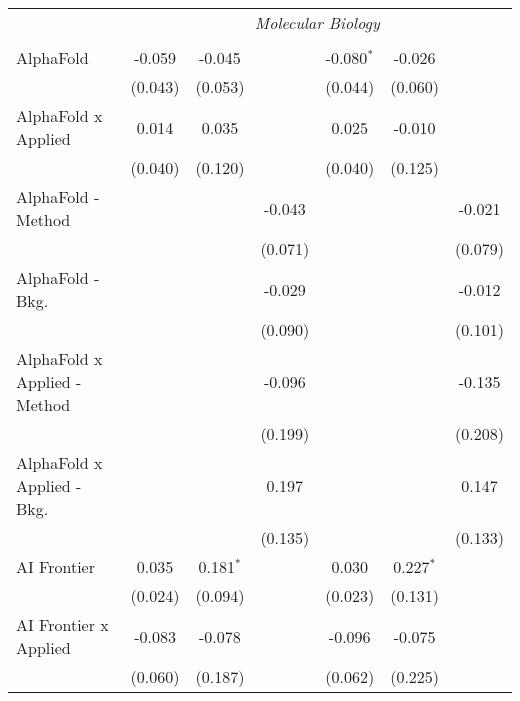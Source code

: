 \begin{tabular}{lcccccc}
 & \multicolumn{6}{c}{\textit{Molecular Biology}} \\ \\
   AlphaFold                      & -0.059  & -0.045        &                & -0.080$^{*}$ & -0.026         &   \\   
                                  & (0.043) & (0.053)       &                & (0.044)      & (0.060)        &   \\   
   AlphaFold x Applied            & 0.014   & 0.035         &                & 0.025        & -0.010         &   \\   
                                  & (0.040) & (0.120)       &                & (0.040)      & (0.125)        &   \\   
   AlphaFold - Method             &         &               & -0.043         &              &                & -0.021\\   
                                  &         &               & (0.071)        &              &                & (0.079)\\   
   AlphaFold - Bkg.               &         &               & -0.029         &              &                & -0.012\\   
                                  &         &               & (0.090)        &              &                & (0.101)\\   
   AlphaFold x Applied - Method   &         &               & -0.096         &              &                & -0.135\\   
                                  &         &               & (0.199)        &              &                & (0.208)\\   
   AlphaFold x Applied - Bkg.     &         &               & 0.197          &              &                & 0.147\\   
                                  &         &               & (0.135)        &              &                & (0.133)\\   
   AI Frontier                    & 0.035   & 0.181$^{*}$   &                & 0.030        & 0.227$^{*}$    &   \\   
                                  & (0.024) & (0.094)       &                & (0.023)      & (0.131)        &   \\   
   AI Frontier x Applied          & -0.083  & -0.078        &                & -0.096       & -0.075         &   \\   
                                  & (0.060) & (0.187)       &                & (0.062)      & (0.225)        &   \\   

\end{tabular}
